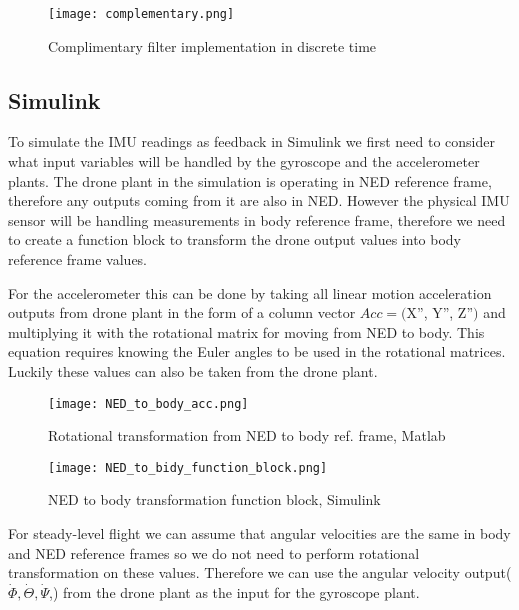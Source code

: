 \begin{figure}[H]
    \begin{center}
    \texttt{[image: complementary.png]}
    \end{center}
    \caption{Complimentary filter implementation in discrete time}
    \label{fig:my_label}
\end{figure}

\subsection{Simulink}
\begin{flushleft}
To simulate the IMU readings as feedback in Simulink we first need to consider what input variables will be handled by the gyroscope and the accelerometer plants. The drone plant in the simulation is operating in NED reference frame, therefore any outputs coming from it are also in NED. However the physical IMU sensor will be handling measurements in body reference frame, therefore we need to create a function block to transform the drone output values into body reference frame values. 

For the accelerometer this can be done by taking all linear motion acceleration outputs from drone plant in the form of a column vector $Acc=($X'', Y'', Z''$)$ and multiplying it with the rotational matrix for moving from NED to body. This equation requires knowing the Euler angles to be used in the rotational matrices. Luckily these values can also be taken from the drone plant.

\begin{figure}[H]
    \begin{center}
    \texttt{[image: NED\_to\_body\_acc.png]}
    \end{center}
    \caption{Rotational transformation from NED to body ref. frame, Matlab}
    \label{fig:my_label}
\end{figure}

\begin{figure}[H]
    \begin{center}
    \texttt{[image: NED\_to\_bidy\_function\_block.png]}
    \end{center}
    \caption{NED to body transformation function block, Simulink}
    \label{fig:my_label}
\end{figure}

For steady-level flight we can assume that angular velocities are the same in body and NED reference frames so we do not need to perform rotational transformation on these values. Therefore we can use the angular velocity output($\dot{\Phi}, \dot{\Theta}, \dot{\Psi}$,) from the drone plant as the input for the gyroscope plant. 


\end{flushleft}

